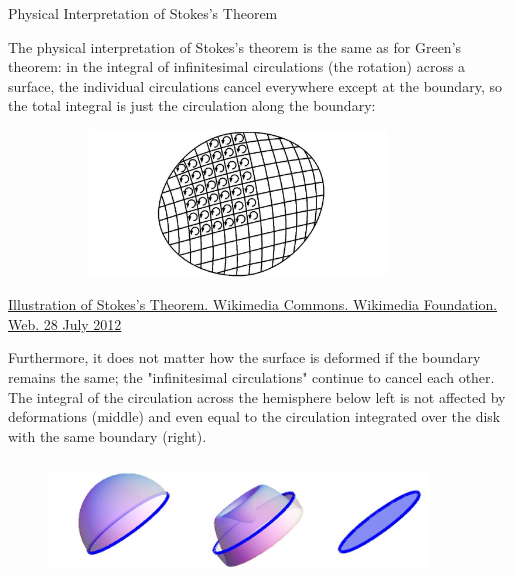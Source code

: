 \documentclass[smaller,hyperref={CJKbookmarks=true}]{beamer}
\begin{document}
\begin{frame}{Physical Interpretation of Stokes's Theorem}
\begin{spacing}{1}
The physical interpretation of Stokes's theorem is the same as for Green's
theorem: in the integral of infinitesimal circulations (the rotation) across a
surface, the individual circulations cancel everywhere except at the
boundary, so the total integral is just the circulation along the boundary:
\begin{figure}
  \centering
  \includegraphics[width=0.9\textwidth,height=110pt]{82.jpg}

\end{figure}
\begin{center}
  \begin{tiny}
    \href{https://commons.wikimedia.org/wiki/File:Stokes.png}{Illustration of Stokes's Theorem. Wikimedia Commons. Wikimedia Foundation. Web. 28 July
2012}
  \end{tiny}
\end{center}
\newpage
Furthermore, it does not matter how the surface is deformed if the
boundary remains the same; the "infinitesimal circulations" continue to
cancel each other. The integral of the circulation across the hemisphere
below left is not af{}fected by deformations (middle) and even equal to the
circulation integrated over the disk with the same boundary (right).
\begin{figure}
  \centering
  \includegraphics[width=0.9\textwidth,height=90pt]{83.jpg}
  
\end{figure}
\end{spacing}
\end{frame}
\end{document}
